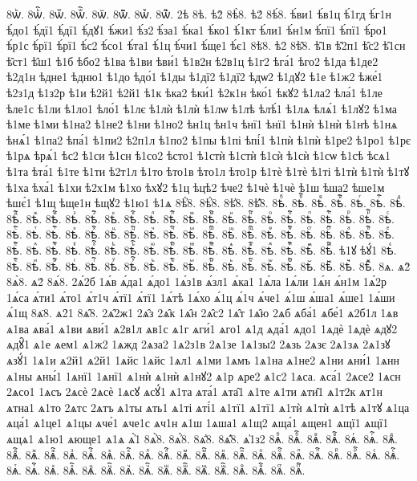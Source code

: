 {8ѡꙺ.
8ѡꙺ҇.
8ѡꙻ.
8ѡꙻ҇.
8ѡ꙼.
8ѡ꙼҇.
8ѡ꙽.
8ѡ꙽҇.
2ѣ
8ѣ.
ѣ2̀
8ѣ̀8.
ѣ2́
8ѣ́8.
ѣ́ви1
ѣ́в1ц
ѣ́1гд
ѣ́г1н
ѣ́до1
ѣ́дї1
ѣ́дї1
ѣ́дꙋ1
ѣ́жи1
ѣ́з2
ѣ́за1
ѣ́ка1
ѣ́ко1
ѣ́1кт
ѣ́ли1
ѣ́н1м
ѣ́пї1
ѣ́пї1
ѣ́ро1
ѣ́р1с
ѣ́рї1
ѣ́рї1
ѣ́с2
ѣ́со1
ѣ́та1
ѣ́1ц
ѣ́чи1
ѣ́ще1
ѣ́є1
8ѣ̈8.
ѣ2̑
8ѣ̑8.
ѣ̑1в
ѣ̑2п1
ѣ̑с2
ѣ̑1сн
ѣ̑ст1
ѣ̑ш1
ѣ1б
ѣбо2
ѣ1ва
ѣ1ви
ѣви́1
ѣ1в2н
ѣ2в1ц
ѣ1г2
ѣга́1
ѣго2
ѣ1да
ѣ1де2
ѣ2д1н
ѣдне1
ѣдню1
ѣ1до
ѣдо́1
ѣ1ды
ѣ1дї2
ѣ1дї2
ѣдѡ2
ѣ1дꙋ2
ѣ1е
ѣ1ж2
ѣже́1
ѣ2з1д
ѣ1з2р
ѣ1и
ѣ2й1
ѣ2й1
ѣ1к
ѣка2
ѣки́1
ѣ2к1н
ѣко́1
ѣкꙋ2
ѣ1ла2
ѣла́1
ѣ1ле
ѣле1с
ѣ1ли
ѣ1ло1
ѣло́1
ѣ1лє
ѣ1лѝ
ѣ1лѝ
ѣ1лѡ
ѣ1лѣ
ѣлѣ́1
ѣ1лѧ
ѣлѧ́1
ѣ1лꙋ2
ѣ1ма
ѣ1ме
ѣ1ми
ѣ1на2
ѣ1не2
ѣ1ни
ѣ1но2
ѣн1ц
ѣн1ч
ѣнї1
ѣнї1
ѣ1нѝ
ѣ1нѝ
ѣ1нѣ
ѣ1нѧ
ѣнѧ́1
ѣ1па2
ѣпа́1
ѣ1пи2
ѣ2п1л
ѣ1по2
ѣ1пы
ѣ1пі
ѣпі́1
ѣ1пѝ
ѣ1пѝ
ѣ1ре2
ѣ1ро1
ѣ1рє
ѣ1рѧ
ѣрѧ́1
ѣс2
ѣ1си
ѣ1сн
ѣ1со2
ѣсто1
ѣ1стѝ
ѣ1стѝ
ѣ1сѝ
ѣ1сѝ
ѣ1сѡ
ѣ1сѣ
ѣсѧ1
ѣ1та
ѣта́1
ѣ1те
ѣ1ти
ѣ2т1л
ѣ1то
ѣто1в
ѣто1л
ѣто1р
ѣ1тѐ
ѣ1тѐ
ѣ1ті
ѣ1тѝ
ѣ1тѝ
ѣ1тꙋ
ѣ1ха
ѣха́1
ѣ1хи
ѣ2х1м
ѣ1хо
ѣхꙋ2
ѣ1ц
ѣцѣ2
ѣче2
ѣ1чѐ
ѣ1чѐ
ѣ1ш
ѣша2
ѣше1м
ѣшє́1
ѣ1щ
ѣще1н
ѣщꙋ2
ѣ1ю1
ѣ1ѧ
8ѣ҆̀8.
8ѣ҆́8.
8ѣ҆̈8.
8ѣ҆̑8.
8ѣⷠ.
8ѣⷠ҇.
8ѣⷡ.
8ѣⷡ҇.
8ѣⷢ.
8ѣⷢ҇.
8ѣⷣ.
8ѣⷣ҇.
8ѣⷤ.
8ѣⷤ҇.
8ѣⷥ.
8ѣⷥ҇.
8ѣⷦ.
8ѣⷦ҇.
8ѣⷧ.
8ѣⷧ҇.
8ѣⷨ.
8ѣⷨ҇.
8ѣⷩ.
8ѣⷩ҇.
8ѣⷪ.
8ѣⷪ҇.
8ѣⷫ.
8ѣⷫ҇.
8ѣⷬ.
8ѣⷬ҇.
8ѣⷭ.
8ѣⷭ҇.
8ѣⷮ.
8ѣⷮ҇.
8ѣⷯ.
8ѣⷯ҇.
8ѣⷰ.
8ѣⷰ҇.
8ѣⷱ.
8ѣⷱ҇.
8ѣⷲ.
8ѣⷲ҇.
8ѣⷳ.
8ѣⷳ҇.
8ѣⷴ.
8ѣⷴ҇.
8ѣⷵ.
8ѣⷵ҇.
8ѣⷶ.
8ѣⷶ҇.
8ѣⷷ.
8ѣⷷ҇.
8ѣⷸ.
8ѣⷸ҇.
8ѣⷹ.
8ѣⷹ҇.
8ѣⷺ.
8ѣⷺ҇.
8ѣⷻ.
8ѣⷻ҇.
8ѣⷼ.
8ѣⷼ҇.
8ѣⷽ.
8ѣⷽ҇.
8ѣⷾ.
8ѣⷾ҇.
8ѣⷿ.
8ѣⷿ҇.
ѣ1ꙋ
ѣꙋ́1
8ѣꙴ.
8ѣꙴ҇.
8ѣꙵ.
8ѣꙵ҇.
8ѣꙶ.
8ѣꙶ҇.
8ѣꙷ.
8ѣꙷ҇.
8ѣꙸ.
8ѣꙸ҇.
8ѣꙹ.
8ѣꙹ҇.
8ѣꙺ.
8ѣꙺ҇.
8ѣꙻ.
8ѣꙻ҇.
8ѣ꙼.
8ѣ꙼҇.
8ѣ꙽.
8ѣ꙽҇.
8ѧ.
ѧ2̀
8ѧ̀8.
ѧ2́
8ѧ́8.
2ѧ́2б
1ѧ́в
ѧ́да1
ѧ́до1
1ѧ́з1в
ѧ́зл1
ѧ́ка1
1ѧ́ла
1ѧ́ли
1ѧ́н
ѧ́н1м
1ѧ́2р
1ѧ́са
ѧ́ти1
ѧ́то1
ѧ́т1ч
ѧ́тї1
ѧ́тї1
1ѧ́тѣ
1ѧ́хо
ѧ́1ц
ѧ́1ч
ѧ́че1
ѧ́1ш
ѧ́ша1
ѧ́ше1
1ѧ́ши
ѧ́1щ
8ѧ̈8.
ѧ2̑1
8ѧ̑8.
2ѧ̑2ж1
2ѧ̑з
2ѧ̑к
1ѧ̑н
2ѧ̑с2
1ѧ̑т
1ѧ̑ю
2ѧб
ѧба́1
ѧбе́1
ѧ2б1л
1ѧв
ѧ1ва
ѧва́1
ѧ1ви
ѧви́1
ѧ2в1л
ѧв1с
ѧ1г
ѧги́1
ѧго1
ѧ1д
ѧда́1
ѧдо1
1ѧдѐ
1ѧдѐ
ѧдꙋ2
ѧдꙋ̑1
ѧ1е
ѧем1
ѧ1ж2
1ѧжд
2ѧза2
1ѧ2з1в
2ѧ1зе
1ѧ1зы2
2ѧзь
2ѧзє
2ѧ1зѧ
2ѧ1зꙋ
ѧзꙋ́1
1ѧ1и
ѧ2й1
ѧ2й1
1ѧйс
1ѧйс
1ѧл1
ѧ1ми
1ѧмъ
1ѧ1на
ѧ1не2
ѧ1ни
ѧни́1
1ѧнн
ѧ1ны
ѧны́1
1ѧнї1
1ѧнї1
ѧ1нѝ
ѧ1нѝ
ѧ1нꙋ2
ѧ1р
ѧре2
ѧ1с2
1ѧса.
ѧса́1
2ѧсе2
1ѧсн
2ѧсо1
1ѧсъ
2ѧсѐ
2ѧсѐ
1ѧсꙋ
ѧсꙋ́1
ѧ1та
ѧта́1
ѧта̑1
ѧ1те
ѧ1ти
ѧти̑1
ѧ1т2к
ѧт1н
ѧтна1
ѧ1то
2ѧтс
2ѧтъ
ѧ1ты
ѧть1
ѧ1ті
ѧті́1
ѧ1тї1
ѧ1тї1
ѧ1тѝ
ѧ1тѝ
ѧ1тѣ
ѧ1тꙋ
ѧ1ца
ѧца́1
ѧ1це1
ѧ1цы
ѧче́1
ѧче1с
ѧч1н
ѧ1ш
1ѧша1
ѧ1щ2
ѧща́1
ѧщен1
ѧщї1
ѧщї1
ѧщѧ1
ѧ1ю1
ѧюще1
ѧ1ѧ
ѧ҆̀1
8ѧ҆̀8.
8ѧ҆́8.
8ѧ҆̈8.
8ѧ҆̑8.
ѧ҆1з2
8ѧⷠ.
8ѧⷠ҇.
8ѧⷡ.
8ѧⷡ҇.
8ѧⷢ.
8ѧⷢ҇.
8ѧⷣ.
8ѧⷣ҇.
8ѧⷤ.
8ѧⷤ҇.
8ѧⷥ.
8ѧⷥ҇.
8ѧⷦ.
8ѧⷦ҇.
8ѧⷧ.
8ѧⷧ҇.
8ѧⷨ.
8ѧⷨ҇.
8ѧⷩ.
8ѧⷩ҇.
8ѧⷪ.
8ѧⷪ҇.
8ѧⷫ.
8ѧⷫ҇.
8ѧⷬ.
8ѧⷬ҇.
8ѧⷭ.
8ѧⷭ҇.
8ѧⷮ.
8ѧⷮ҇.
8ѧⷯ.
8ѧⷯ҇.
8ѧⷰ.
8ѧⷰ҇.
8ѧⷱ.
8ѧⷱ҇.
8ѧⷲ.
8ѧⷲ҇.
8ѧⷳ.
8ѧⷳ҇.
8ѧⷴ.
8ѧⷴ҇.
8ѧⷵ.
8ѧⷵ҇.
}
